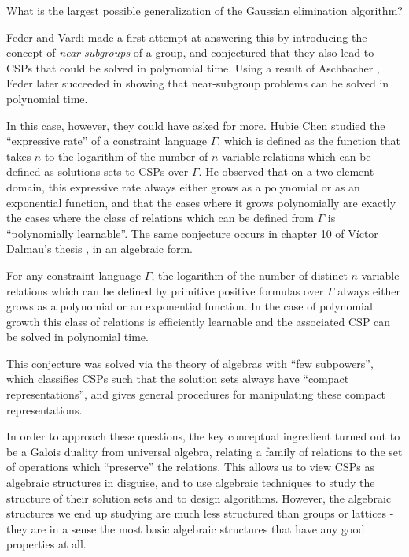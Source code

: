 \documentclass[letterpaper,11pt]{article}
\begin{document}
\begin{prob} What is the largest possible generalization of the Gaussian elimination algorithm?
\end{prob}

Feder and Vardi \cite{feder-vardi} made a first attempt at answering this by introducing the concept of \emph{near-subgroups} of a group, and conjectured that they also lead to CSPs that could be solved in polynomial time. Using a result of Aschbacher \cite{near-subgroups-aschbacher}, Feder \cite{near-subgroups-feder} later succeeded in showing that near-subgroup problems can be solved in polynomial time.

In this case, however, they could have asked for more. Hubie Chen \cite{chen-few-subpowers} studied the ``expressive rate'' of a constraint language $\Gamma$, which is defined as the function that takes $n$ to the logarithm of the number of $n$-variable relations which can be defined as solutions sets to CSPs over $\Gamma$. He observed that on a two element domain, this expressive rate always either grows as a polynomial or as an exponential function, and that the cases where it grows polynomially are exactly the cases where the class of relations which can be defined from $\Gamma$ is ``polynomially learnable''. The same conjecture occurs in chapter 10 of V\'ictor Dalmau's thesis \cite{dalmau-thesis}, in an algebraic form.

\begin{conj} For any constraint language $\Gamma$, the logarithm of the number of distinct $n$-variable relations which can be defined by primitive positive formulas over $\Gamma$ always either grows as a polynomial or an exponential function. In the case of polynomial growth this class of relations is efficiently learnable and the associated CSP can be solved in polynomial time.
\end{conj}

This conjecture was solved via the theory of algebras with ``few subpowers'', which classifies CSPs such that the solution sets always have ``compact representations'', and gives general procedures for manipulating these compact representations.

In order to approach these questions, the key conceptual ingredient turned out to be a Galois duality from universal algebra, relating a family of relations to the set of operations which ``preserve'' the relations. This allows us to view CSPs as algebraic structures in disguise, and to use algebraic techniques to study the structure of their solution sets and to design algorithms. However, the algebraic structures we end up studying are much less structured than groups or lattices - they are in a sense the most basic algebraic structures that have any good properties at all.
\end{document}
